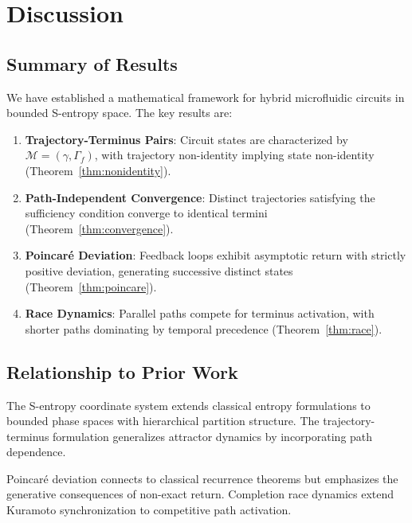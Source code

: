 \documentclass[aps,prl,twocolumn,superscriptaddress,showpacs]{revtex4-2}
\newcommand{\traj}{\gamma}
\newcommand{\term}{\Gamma}
\begin{document}
\section{Discussion}
\label{sec:discussion}

\subsection{Summary of Results}

We have established a mathematical framework for hybrid microfluidic circuits in bounded S-entropy space. The key results are:

\begin{enumerate}
\item \textbf{Trajectory-Terminus Pairs}: Circuit states are characterized by $\mathcal{M} = (\traj, \term_f)$, with trajectory non-identity implying state non-identity (Theorem~\ref{thm:nonidentity}).

\item \textbf{Path-Independent Convergence}: Distinct trajectories satisfying the sufficiency condition converge to identical termini (Theorem~\ref{thm:convergence}).

\item \textbf{Poincar\'{e} Deviation}: Feedback loops exhibit asymptotic return with strictly positive deviation, generating successive distinct states (Theorem~\ref{thm:poincare}).

\item \textbf{Race Dynamics}: Parallel paths compete for terminus activation, with shorter paths dominating by temporal precedence (Theorem~\ref{thm:race}).
\end{enumerate}

\subsection{Relationship to Prior Work}

The S-entropy coordinate system extends classical entropy formulations \cite{shannon1948mathematical, jaynes1957information} to bounded phase spaces with hierarchical partition structure. The trajectory-terminus formulation generalizes attractor dynamics \cite{strogatz2015nonlinear} by incorporating path dependence.

Poincar\'{e} deviation connects to classical recurrence theorems \cite{poincare1890probleme} but emphasizes the generative consequences of non-exact return. Completion race dynamics extend Kuramoto synchronization \cite{kuramoto1975self, strogatz2000kuramoto} to competitive path activation.
\end{document}

